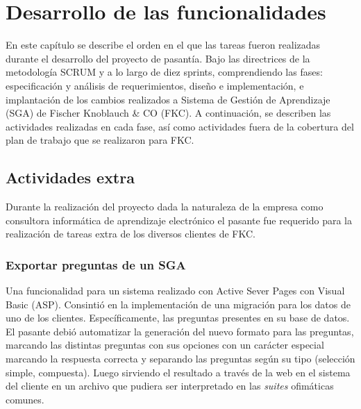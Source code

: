 ﻿\chapter{Desarrollo de las funcionalidades}
\thispagestyle{empty} %

En este capítulo se describe el orden en el que las tareas fueron realizadas durante el desarrollo del proyecto de pasantía. Bajo las directrices de la metodología SCRUM y a lo largo de diez sprints, comprendiendo las fases: especificación y análisis de requerimientos, diseño e implementación, e implantación de los cambios realizados a Sistema de Gestión de Aprendizaje (SGA) de Fischer Knoblauch \& CO (FKC). A continuación, se describen las actividades realizadas en cada fase, así como actividades fuera de la cobertura del plan de trabajo que se realizaron para FKC.












\section{Actividades extra} %
\label{sec:actividades_extra}

Durante la realización del proyecto dada la naturaleza de la empresa como consultora informática de aprendizaje electrónico el pasante fue requerido para la realización de tareas extra de los diversos clientes de FKC.

	\subsection{Exportar preguntas de un SGA} %
	\label{sub:exportar_preguntas_de_un_sga}


	Una funcionalidad para un sistema realizado con Active Sever Pages con Visual Basic (ASP). Consintió en la implementación de una migración para los datos de uno de los clientes. Específicamente, las preguntas presentes en su base de datos. El pasante debió automatizar la generación del nuevo formato para las preguntas, marcando las distintas preguntas con sus opciones con un carácter especial marcando la respuesta correcta y separando las preguntas según su tipo (selección simple, compuesta). Luego sirviendo el resultado a través de la web en el sistema del cliente en un archivo que pudiera ser interpretado en las \emph{suites} ofimáticas comunes.

